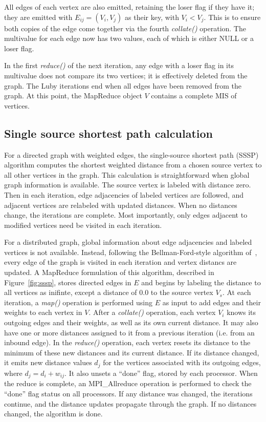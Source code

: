 All edges of each vertex are also emitted, retaining the loser flag if
they have it; they are emitted with $E_{ij} = (V_i, V_j)$ as their
key, with $V_i < V_j$.  This is to ensure both copies of the edge come
together via the fourth {\it collate()} operation.  The multivalue for
each edge now has two values, each of which is either NULL or a loser
flag.

In the first {\it reduce()} of the next iteration, any edge with a
loser flag in its multivalue does not compare its two vertices; it is
effectively deleted from the graph.  The Luby iterations end when all
edges have been removed from the graph.  At this point, the MapReduce
object $V$ contains a complete MIS of vertices.

\subsection{Single source shortest path calculation}

For a directed graph with weighted edges, the single-source shortest
path (SSSP) algorithm computes the shortest weighted distance from a
chosen source vertex to all other vertices in the graph.  This
calculation is straightforward when global graph information is
available.  The source vertex is labeled with distance zero.  Then in
each iteration, edge adjacencies of labeled vertices are followed, and
adjacent vertices are relabeled with updated distances.  When no
distances change, the iterations are complete.  Most importantly, only
edges adjacent to modified vertices need be visited in each iteration.

For a distributed graph, global information about edge adjacencies and
labeled vertices is not available.  Instead, following the
Bellman-Ford-style algorithm of~\cite{SSSPMapReduce, Bellman58,
Ford62}, every edge of the graph is visited in each iteration and
vertex distancs are updated.  A MapReduce formulation of this
algorithm, described in Figure~\ref{fig:sssp}, stores directed edges
in $E$ and begins by labeling the distance to all vertices as
inifinte, except a distance of 0.0 to the source vertex $V_s$.  At
each iteration, a {\it map()} operation is performed using $E$ as
input to add edges and their weights to each vertex in $V$.  After a
{\it collate()} operation, each vertex $V_i$ knows its outgoing edges
and their weights, as well as its own current distance.  It may also
have one or more distances assigned to it from a previous iteration
(i.e. from an inbound edge).  In the {\it reduce()} operation, each
vertex resets its distance to the minimum of these new distances and
its current distance.  If its distance changed, it emits new distance
values $d_j$ for the vertices associated with its outgoing edges,
where $d_j = d_i + w_{ij}$.  It also unsets a ``done'' flag, stored by
each processor.  When the reduce is complete, an MPI\_Allreduce
operation is performed to check the ``done'' flag status on all
processors.  If any distance was changed, the iterations continue, and
the distance updates propagate through the graph.  If no distances
changed, the algorithm is done.

